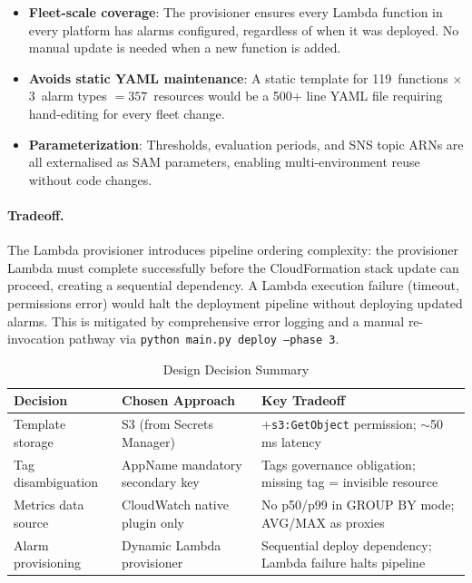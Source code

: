 \begin{itemize}
    \item \textbf{Fleet-scale coverage}: The provisioner ensures every
          Lambda function in every platform has alarms
          configured, regardless of when it was deployed. No manual
          update is needed when a new function is added.

    \item \textbf{Avoids static YAML maintenance}: A static template
          for 119~functions $\times$ 3~alarm types $= 357$~resources
          would be a 500+ line YAML file requiring hand-editing for
          every fleet change.

    \item \textbf{Parameterization}: Thresholds, evaluation periods,
          and SNS topic ARNs are all externalised as SAM parameters,
          enabling multi-environment reuse without code changes.
\end{itemize}

\paragraph{Tradeoff.}
The Lambda provisioner introduces pipeline ordering complexity: the
provisioner Lambda must complete successfully before the CloudFormation
stack update can proceed, creating a sequential dependency. A Lambda
execution failure (timeout, permissions error) would halt the deployment
pipeline without deploying updated alarms. This is mitigated by
comprehensive error logging and a manual re-invocation pathway via
\texttt{python main.py deploy --phase 3}.

\begin{table}[ht]
\centering
\caption{Design Decision Summary}
\label{tab:design_decisions}
\begin{tabular}{p{3.2cm}p{3.5cm}p{5.0cm}}
\toprule
\textbf{Decision} & \textbf{Chosen Approach} & \textbf{Key Tradeoff} \\
\midrule
Template storage & S3 (from Secrets Manager) & +\texttt{s3:GetObject} permission; $\sim$50\,ms latency \\
\midrule
Tag disambiguation & AppName mandatory secondary key & Tags governance obligation; missing tag = invisible resource \\
\midrule
Metrics data source & CloudWatch native plugin only & No p50/p99 in GROUP BY mode; AVG/MAX as proxies \\
\midrule
Alarm provisioning & Dynamic Lambda provisioner & Sequential deploy dependency; Lambda failure halts pipeline \\
\bottomrule
\end{tabular}
\end{table}

